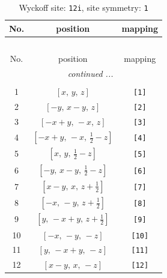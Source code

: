 \documentclass[fleqn,8pt]{jsarticle}
\begin{document}
\renewcommand{\arraystretch}{1.2}
\begin{longtable}{ccc}
\caption{Wyckoff site: {\tt 12i}, site symmetry: {\tt 1}}
 \\
 \hline \hline
No. & position & mapping \\ \hline \endfirsthead

\multicolumn{2}{l}{\tablename\ \thetable{}} \\
 \hline \hline
No. & position & mapping \\ \hline \endhead

 \hline \hline
\multicolumn{2}{r}{\footnotesize\it continued ...} \\ \endfoot

 \hline \hline
\multicolumn{2}{r}{} \\ \endlastfoot

1 & $\left[ x,\, y,\, z \right]$ & {\tt [1]} \\ \hline
2 & $\left[ - y,\, x - y,\, z \right]$ & {\tt [2]} \\ \hline
3 & $\left[ - x + y,\, - x,\, z \right]$ & {\tt [3]} \\ \hline
4 & $\left[ - x + y,\, - x,\, \frac{1}{2} - z \right]$ & {\tt [4]} \\ \hline
5 & $\left[ x,\, y,\, \frac{1}{2} - z \right]$ & {\tt [5]} \\ \hline
6 & $\left[ - y,\, x - y,\, \frac{1}{2} - z \right]$ & {\tt [6]} \\ \hline
7 & $\left[ x - y,\, x,\, z + \frac{1}{2} \right]$ & {\tt [7]} \\ \hline
8 & $\left[ - x,\, - y,\, z + \frac{1}{2} \right]$ & {\tt [8]} \\ \hline
9 & $\left[ y,\, - x + y,\, z + \frac{1}{2} \right]$ & {\tt [9]} \\ \hline
10 & $\left[ - x,\, - y,\, - z \right]$ & {\tt [10]} \\ \hline
11 & $\left[ y,\, - x + y,\, - z \right]$ & {\tt [11]} \\ \hline
12 & $\left[ x - y,\, x,\, - z \right]$ & {\tt [12]} \\
\end{longtable}
\end{document}
